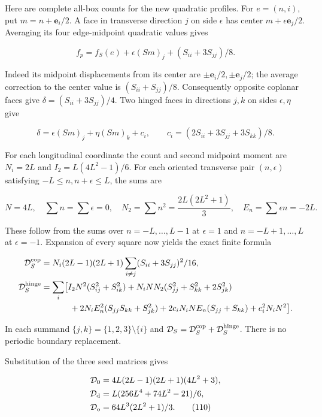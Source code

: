Here are complete all-box counts for the new quadratic profiles. For
\(e=(n,i)\), put \(m=n+\mathbf e_i/2\). A face in transverse direction
\(j\) on side \(\epsilon\) has center \(m+\epsilon\mathbf e_j/2\).
Averaging its four edge-midpoint quadratic values gives

\[
f_p=f_S(e)+\epsilon(Sm)_j+(S_{ii}+3S_{jj})/8.
\]

Indeed its midpoint displacements from its center are
\(\pm\mathbf e_i/2,\pm\mathbf e_j/2\); the average correction to the
center value is \((S_{ii}+S_{jj})/8\). Consequently opposite coplanar
faces give \(\delta=(S_{ii}+3S_{jj})/4\). Two hinged faces in directions
\(j,k\) on sides \(\epsilon,\eta\) give

\[
\delta=\epsilon(Sm)_j+\eta(Sm)_k+c_i,\qquad
 c_i=(2S_{ii}+3S_{jj}+3S_{kk})/8 .
\]

For each longitudinal coordinate the count and second midpoint moment
are \(N_i=2L\) and \(I_2=L(4L^2-1)/6\). For each oriented transverse
pair \((n,\epsilon)\) satisfying \(-L\le n,n+\epsilon\le L\), the sums
are

\[
N=4L,\quad \sum n=\sum\epsilon=0,\quad
 N_2=\sum n^2=\frac{2L(2L^2+1)}3,\quad
 E_n=\sum\epsilon n=-2L .
\]

These follow from the sums over \(n=-L,\ldots,L-1\) at \(\epsilon=1\)
and \(n=-L+1,\ldots,L\) at \(\epsilon=-1\). Expansion of every square
now yields the exact finite formula

\[
\begin{aligned}
 \mathcal D_S^{\rm cop}&=N_i(2L-1)(2L+1)
                  \sum_{i\ne j}(S_{ii}+3S_{jj})^2/16,\\
 \mathcal D_S^{\rm hinge}
 &=\sum_i\bigl[
 I_2N^2(S_{ij}^2+S_{ik}^2)
 +N_iNN_2(S_{jj}^2+S_{kk}^2+2S_{jk}^2)\\
 &\hspace{12mm}+2N_iE_n^2(S_{jj}S_{kk}+S_{jk}^2)
 +2c_iN_iNE_n(S_{jj}+S_{kk})+c_i^2N_iN^2\bigr].
\end{aligned}
\]

In each summand \(\{j,k\}=\{1,2,3\}\setminus\{i\}\) and
\(\mathcal D_S=\mathcal D_S^{\rm cop}+\mathcal D_S^{\rm hinge}\). There
is no periodic boundary replacement.

Substitution of the three seed matrices gives

\[
\begin{aligned}
 \mathcal D_0&=4L(2L-1)(2L+1)(4L^2+3),\\
 \mathcal D_{\rm d}&=L(256L^4+74L^2-21)/6,\\
 \mathcal D_{\rm o}&=64L^3(2L^2+1)/3.\qquad\text{(110)}
\end{aligned}
\]

